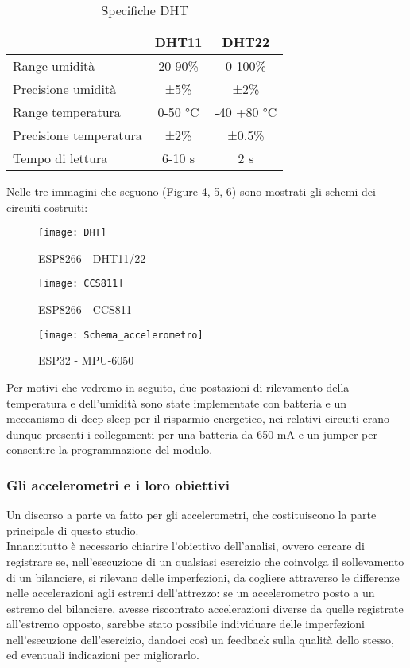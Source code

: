 \documentclass[fleqn,10pt]{SelfArx} %
\begin{document}
\begin{table}[hbt]
	\caption{Specifiche DHT}
	\centering
	\begin{tabular}{lcc}
		\toprule
			 & \textbf{DHT11} & \textbf{DHT22} \\
		\midrule
		Range umidità & 20-90\% & 0-100\% \\
		Precisione umidità & ±5\% & ±2\% \\
		Range temperatura & 0-50 °C & -40 +80 °C \\
		Precisione temperatura & ±2\% & ±0.5\% \\
		Tempo di lettura & 6-10 s & 2 s \\
		\bottomrule
	\end{tabular}
	\label{tab:label}
\end{table}

Nelle tre immagini che seguono (Figure 4, 5, 6) sono mostrati gli schemi dei circuiti costruiti: 

\begin{figure}[htb!]\centering
	\texttt{[image: DHT]}
	\caption{ESP8266 - DHT11/22}
	\label{fig:schermo}
\end{figure}

\begin{figure}[htb!]\centering
	\texttt{[image: CCS811]}
	\caption{ESP8266 - CCS811}
	\label{fig:schermo}
\end{figure}

\begin{figure}[htb!]\centering
	\texttt{[image: Schema\_accelerometro]}
	\caption{ESP32 - MPU-6050}
	\label{fig:schermo}
\end{figure}

Per motivi che vedremo in seguito, due postazioni di rilevamento della temperatura e dell'umidità sono state 
implementate con batteria e un meccanismo di deep sleep per il risparmio energetico, nei relativi circuiti erano 
dunque presenti i collegamenti per una batteria da 650 mA e un jumper per consentire la programmazione del modulo.

\subsubsection{Gli accelerometri e i loro obiettivi}

Un discorso a parte va fatto per gli accelerometri, che costituiscono la parte principale di questo studio.\\
Innanzitutto è necessario chiarire l'obiettivo dell'analisi, ovvero cercare di registrare 
se, nell'esecuzione di un qualsiasi esercizio che coinvolga il sollevamento di un bilanciere, si rilevano delle 
imperfezioni, da cogliere attraverso le differenze nelle accelerazioni agli estremi dell'attrezzo: se un accelerometro 
posto a un estremo del bilanciere, avesse riscontrato accelerazioni diverse da quelle registrate 
all'estremo opposto, sarebbe stato possibile individuare delle imperfezioni nell'esecuzione dell'esercizio, 
dandoci così un feedback sulla qualità dello stesso, ed eventuali indicazioni per migliorarlo.\\
\end{document}
